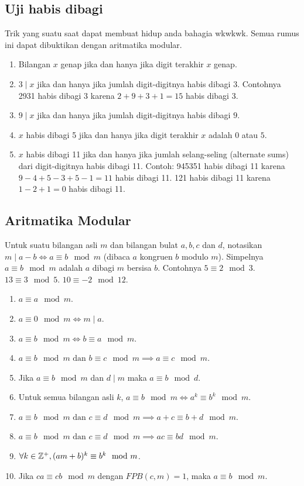 \documentclass[11pt]{scrartcl}
\begin{document}
    \subsection{Uji habis dibagi}
    Trik yang suatu saat dapat membuat hidup anda bahagia wkwkwk. Semua rumus ini dapat dibuktikan dengan aritmatika modular.
    \begin{enumerate}
        \item Bilangan $x$ genap jika dan hanya jika digit terakhir $x$ genap.
        \item $3 \mid x$ jika dan hanya jika jumlah digit-digitnya habis dibagi $3$. Contohnya 2931 habis dibagi 3 karena $2+9+3+1=15$ habis dibagi 3.
        \item $9 \mid x$ jika dan hanya jika jumlah digit-digitnya habis dibagi $9$.
        \item $x$ habis dibagi 5 jika dan hanya jika digit terakhir $x$ adalah $0$ atau $5$.
        \item $x$ habis dibagi 11 jika dan hanya jika jumlah selang-seling (alternate sums) dari digit-digitnya habis dibagi 11. Contoh: 945351 habis dibagi 11 karena $9-4+5-3+5-1=11$ habis dibagi 11. 121 habis dibagi 11 karena $1-2+1=0$ habis dibagi 11.
    \end{enumerate}
    
    \subsection{Aritmatika Modular}
    Untuk suatu bilangan asli $m$ dan bilangan bulat $a,b,c$ dan $d$, notasikan $m\mid a-b \iff a \equiv b \mod m$ (dibaca $a$ kongruen $b$ modulo $m$). Simpelnya $a \equiv b \mod m$ adalah $a$ dibagi $m$ bersisa $b$. Contohnya $5 \equiv 2 \mod 3$. $13 \equiv 3 \mod 5$. $10 \equiv -2 \mod 12$.
    \begin{enumerate}
        \item $a \equiv a \mod m$.
        \item $a \equiv 0 \mod m \iff m\mid a$.
        \item $a \equiv b \mod m \iff b \equiv a \mod m$.
        \item $a \equiv b \mod m \text{ dan } b \equiv c \mod m \implies a \equiv c \mod m$.
        \item Jika $a \equiv b \mod m$ dan $d\mid m$ maka $a \equiv b \mod d$.
        \item Untuk semua bilangan asli $k$, $a \equiv b \mod m \iff a^k \equiv b^k \mod m$.
        \item $a \equiv b \mod m \text{ dan } c \equiv d \mod m \implies a+c \equiv b+d \mod m$.
        \item $a \equiv b \mod m \text{ dan } c \equiv d \mod m \implies ac \equiv bd \mod m$.
        \item $\forall k\in \mathbb Z^+, (am+b)^k \equiv b^k \mod m$.
        \item Jika $ca \equiv cb \mod m$ dengan $FPB(c,m)=1$, maka $a \equiv b \mod m$.
    \end{enumerate}
    
\end{document}
